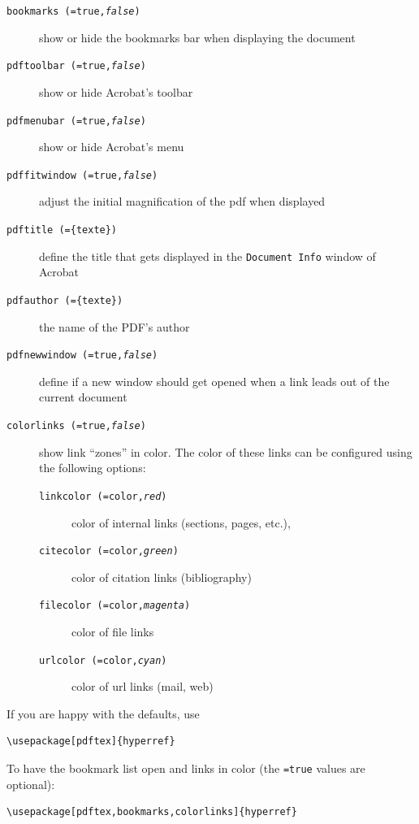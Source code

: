 \begin{description}
  \item[\texttt{bookmarks (=true,\textit{false})}] show or hide the
    bookmarks bar when displaying the document
  \item [\texttt{pdftoolbar (=true,\textit{false})}] show or hide
    Acrobat's toolbar
  \item [\texttt{pdfmenubar (=true,\textit{false})}] show or hide
    Acrobat's menu
  \item [\texttt{pdffitwindow (=true,\textit{false})}] adjust the
    initial magnification of the pdf when displayed
  \item [\texttt{pdftitle (=\{texte\})}] define the title that gets
    displayed in the \texttt{Document Info} window of Acrobat
  \item [\texttt{pdfauthor (=\{texte\})}] the name of the PDF's author
  \item [\texttt{pdfnewwindow (=true,\textit{false})}] define if a new
    window should get opened when a link leads out of the current
    document
  \item [\texttt{colorlinks (=true,\textit{false})}] show link
    ``zones'' in color. The color of these links can be configured
    using the following options:
    \begin{description}
    \item [\texttt{linkcolor (=color,\textit{red})}] color of internal
      links (sections, pages, etc.),
    \item [\texttt{citecolor (=color,\textit{green})}] color of
      citation links (bibliography)
    \item [\texttt{filecolor (=color,\textit{magenta})}] color of file
      links
    \item [\texttt{urlcolor (=color,\textit{cyan})}] color of url
      links (mail, web)
    \end{description}
\end{description}

\vspace{\baselineskip}

If you are happy with the defaults, use
\begin{code}
\begin{verbatim}
\usepackage[pdftex]{hyperref}
\end{verbatim}
\end{code}

To have the bookmark list open and links in color
(the \texttt{=true} values are optional):
\begin{code}
\begin{verbatim}
\usepackage[pdftex,bookmarks,colorlinks]{hyperref}
\end{verbatim}
\end{code}

